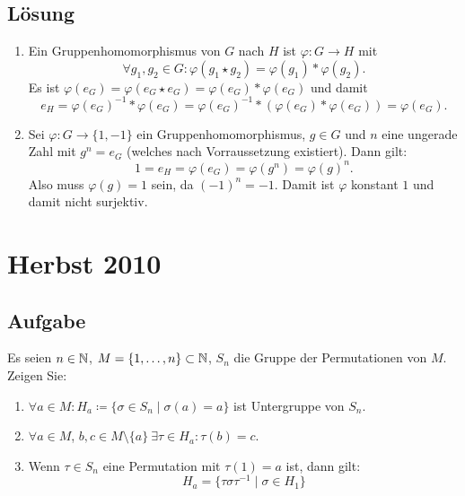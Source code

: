 \subsection{Lösung}
\begin{enumerate}
	\item Ein Gruppenhomomorphismus von \( G \) nach \( H \) ist \( \varphi: G \to H \) mit
	\begin{equation*}
	 	\forall g_1, g_2 \in G: \varphi(g_1 \star g_2) = \varphi(g_1) * \varphi(g_2)\text{.}
	 \end{equation*} 
	 Es ist \( \varphi(e_G) = \varphi(e_G \star e_G) = \varphi(e_G) * \varphi(e_G) \) und damit
	 \begin{equation*}
	 	e_H = \varphi(e_G)^{-1} * \varphi(e_G) = \varphi(e_G)^{-1} * (\varphi(e_G) * \varphi(e_G)) = \varphi(e_G)\text{.}
	 \end{equation*}

	 \item Sei \( \varphi: G \to \{ 1, -1 \} \) ein Gruppenhomomorphismus, \( g \in G \) und \( n \) eine ungerade Zahl mit \( g^n = e_G \) (welches nach Vorraussetzung existiert). Dann gilt:
	 \begin{equation*}
	 	1 = e_H = \varphi(e_G) = \varphi(g^n) = \varphi(g)^n\text{.}
	 \end{equation*}
	 Also muss \( \varphi(g) = 1 \) sein, da \( (-1)^n = -1 \). Damit ist \( \varphi \) konstant \( 1 \) und damit nicht surjektiv.
\end{enumerate}

\newpage


\section{Herbst 2010}

\subsection{Aufgabe}
Es seien \( n \in \mathbb{N} \), \( M = \{ 1,\dots,n \} \subset \mathbb{N} \), \( S_n \) die Gruppe der Permutationen von \( M \). Zeigen Sie:
\begin{enumerate}
	\item \( \forall a \in M : H_a \coloneqq \{ \sigma \in S_n \mid \sigma(a) = a \} \) ist Untergruppe von \( S_n \).
	\item \( \forall a \in M \), \( b,c \in M\setminus \{ a \} \ \exists \tau \in H_a: \tau(b) = c \).
	\item Wenn \( \tau \in S_n \) eine Permutation mit \( \tau(1) = a \) ist, dann gilt:
	\begin{equation*}
		H_a = \{ \tau\sigma\tau^{-1} \mid \sigma \in H_1 \}
	\end{equation*}
\end{enumerate}

